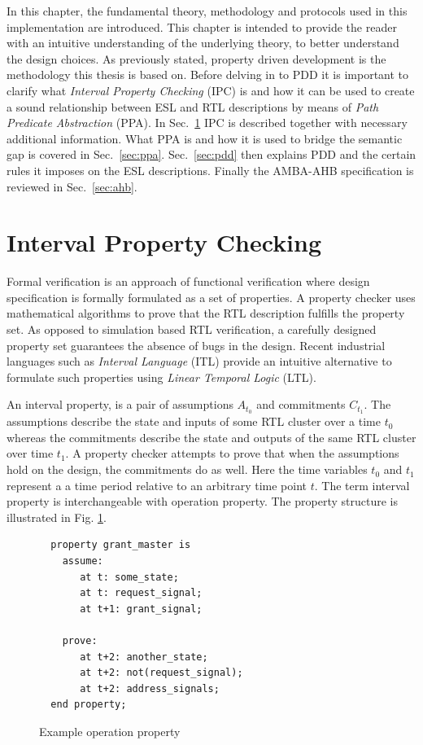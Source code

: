 \label{ch:theory}

In this chapter, the fundamental theory, methodology and protocols used in this implementation are introduced. This chapter is intended to provide the reader with an intuitive understanding of the underlying theory, to better understand the design choices. As previously stated, property driven development is the methodology this thesis is based on. Before delving in to PDD it is important to clarify what \textit{Interval Property Checking} (IPC) is and how it can be used to create a sound relationship between ESL and RTL descriptions by means of \textit{Path Predicate Abstraction} (PPA). In Sec.~\ref{sec:ipc} IPC is described together with necessary additional information. What PPA is and how it is used to bridge the semantic gap is covered in Sec.~\ref{sec:ppa}. Sec.~\ref{sec:pdd} then explains PDD and the certain rules it imposes on the ESL descriptions. Finally the AMBA-AHB specification is reviewed in Sec.~\ref{sec:ahb}.       


\section{Interval Property Checking}
\label{sec:ipc}
Formal verification is an approach of functional verification where design specification is formally formulated as a set of properties. A property checker uses mathematical algorithms to prove that the RTL description fulfills the property set. As opposed to simulation based RTL verification, a carefully designed property set guarantees the absence of bugs in the design. Recent industrial languages such as \textit{Interval Language} (ITL) provide an intuitive alternative to formulate such properties using \textit{Linear Temporal Logic} (LTL). \par
An interval property, is a pair of assumptions $A_{t_0}$ and commitments $C_{t_1}$. The assumptions describe the state and inputs of some RTL cluster over a time $t_0$ whereas the commitments describe the state and outputs of the same RTL cluster over time $t_1$. A property checker attempts to prove that when the assumptions hold on the design, the commitments do as well. Here the time variables $t_0$ and $t_1$ represent a a time period relative to an arbitrary time point $t$. The term interval property is interchangeable with operation property. The property structure is illustrated in Fig.
\ref{fig:exop}.  

\begin{figure}[hbt]
\begin{lstlisting}
  property grant_master is
    assume:
       at t: some_state;
       at t: request_signal;
       at t+1: grant_signal;

    prove:
       at t+2: another_state;
       at t+2: not(request_signal);
       at t+2: address_signals;
  end property; 
\end{lstlisting}
\label{fig:exop}
\caption{Example operation property}
\end{figure}

